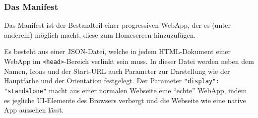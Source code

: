 \documentclass[a4paper,12pt,ngerman,listof=numbered]{scrartcl}      %
\providecommand{\inlinecode}[1]{\texttt{#1}}
\begin{document}
	\subsubsection{Das Manifest}
	Das Manifest ist der Bestandteil einer progressiven WebApp, der es (unter anderem) möglich macht, diese zum Homescreen hinzuzufügen.\par
	Es besteht aus einer JSON-Datei, welche in jedem HTML-Dokument einer WebApp im \inlinecode{<head>}-Bereich verlinkt sein muss. In dieser Datei werden neben dem Namen, Icons und der Start-URL auch Parameter zur Darstellung wie der Hauptfarbe und der Orientation festgelegt. Der Parameter \inlinecode{"{}display"{}: "{}standalone"{}} macht aus einer normalen Webseite eine ``echte'' WebApp, indem es jegliche UI-Elemente des Browsers verbergt und die Webseite wie eine native App aussehen lässt.\par
	
\end{document}
